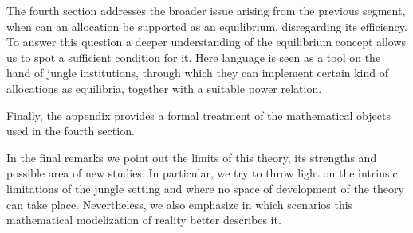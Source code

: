 \documentclass[12pt,a4paper]{article}
\numberwithin{theorem}{section}
\numberwithin{definition}{section}
\numberwithin{example}{section}
\numberwithin{exercise}{section}
\begin{document}
The fourth section addresses the broader issue arising from the previous segment, when can an allocation be supported as an equilibrium, disregarding its efficiency. To answer this question a deeper understanding of the equilibrium concept allows us to spot a sufficient condition for it. Here language is seen as a tool on the hand of jungle institutions, through which they can implement certain kind of allocations as equilibria, together with a suitable power relation.     


Finally, the appendix provides a formal treatment of the mathematical objects used in the fourth section. 

In the final remarks we point out the limits of this theory, its strengths and possible area of new studies. In particular, we try to throw light on the intrinsic limitations of the jungle setting and where no space of development of the theory can take place. Nevertheless, we also emphasize in which scenarios this mathematical modelization of reality better describes it.





\end{document}
